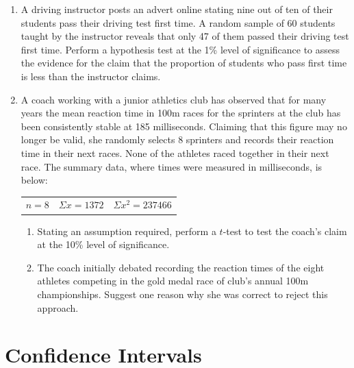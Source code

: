 \documentclass[
  11pt,
]{book}
\begin{document}
\begin{enumerate}
    \begin{enumerate}
        \item Perform a parametric test to determine whether the data provides evidence to support the council's claim that the speed bumps have been successful in reducing the mean speed of cars passing through the village.
        \item State an assumption required for the test conducted in part (a).
    \end{enumerate}
    \item A driving instructor posts an advert online stating nine out of ten of their students pass their driving test first time. A random sample of 60 students taught by the instructor reveals that only 47 of them passed their driving test first time. Perform a hypothesis test at the 1\% level of significance to assess the evidence for the claim that the proportion of students who pass first time is less than the instructor claims.
    \item A coach working with a junior athletics club has observed that for many years the mean reaction time in 100m races for the sprinters at the club has been consistently stable at 185 milliseconds. Claiming that this figure may no longer be valid, she randomly selects 8 sprinters and records their reaction time in their next races. None of the athletes raced together in their next race. The summary data, where times were measured in milliseconds, is below:
    \begin{center}
    \begin{tabular}{c c c} 
      $n=\text{8}$ & $\Sigma x=\text{1372}$ & $\Sigma x^\text{2}=\text{237466}$\\ 
    \end{tabular}
    \end{center}
    \begin{enumerate}
        \item Stating an assumption required, perform a $t$-test to test the coach's claim at the 10\% level of significance.
        \item The coach initially debated recording the reaction times of the eight athletes competing in the gold medal race of club's annual 100m championships. Suggest one reason why she was correct to reject this approach.
    \end{enumerate}
\end{enumerate}

\pagebreak

\chapter{Confidence Intervals}\label{confidence-intervals}
\end{document}

